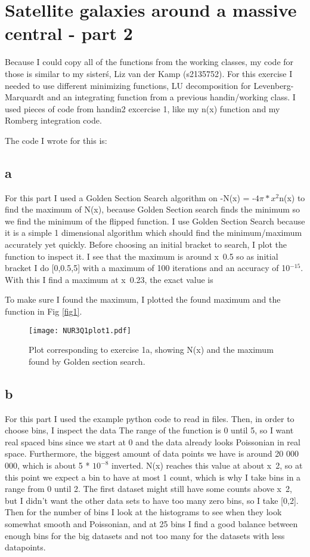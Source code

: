 \section{Satellite galaxies around a massive central - part 2}

Because I could copy all of the functions from the working classes, 
my code for those is similar to my sister\'s, Liz van der Kamp (s2135752). 
For this exercise I needed to use different minimizing functions, LU decomposition for Levenberg-Marquardt
and an integrating function from a previous handin/working class.
I used pieces of code from handin2 excercise 1, like my n(x) function and my Romberg integration code.

The code I wrote for this is:


\subsection*{a}

For this part I used a Golden Section Search algorithm on -N(x) = -$4\pi *x^2$n(x) to find the maximum of N(x),
because Golden Section search finds the minimum so we find the minimum of the flipped function. I use Golden Section
Search because it is a simple 1 dimensional algorithm which should find the minimum/maximum accurately yet quickly.
Before choosing an initial bracket to search, I plot the function to inspect it. I see that the maximum is around 
x~0.5 so as initial bracket I do [0,0.5,5] with a maximum of 100 iterations and an accuracy of 10$^{-15}$. 
With this I find a maximum at x~0.23, the exact value is


To make sure I found the maximum, I plotted the found maximum and the function in Fig \ref{fig1}.
\begin{figure}[h!]
  \centering
  \texttt{[image: NUR3Q1plot1.pdf]}
  \caption{Plot corresponding to exercise 1a, showing  N(x) and the maximum found by Golden section search.}
  \label{fig:fig1}
\end{figure} 


\subsection*{b}

For this part I used the example python code to read in files. Then, in order to choose bins, I inspect the data
The range of the function is 0 until 5, so I want real spaced bins since we start at 0 and the data already looks
Poissonian in real space. Furthermore, the biggest amount of data points we have is around 20 000 000, which is about 
5 * $10^{-8}$ inverted. N(x) reaches this value at about x~2, so at this point we expect a bin to have at most 1 count,
which is why I take bins in a range from 0 until 2. The first dataset might still have some counts above x~2, but
I didn't want the other data sets to have too many zero bins, so I take [0,2].
Then for the number of bins I look at the histograms to see when they look somewhat smooth and Poissonian, and at 
25 bins I find a good balance between enough bins for the big datasets and not too many for the datasets with less
datapoints.

